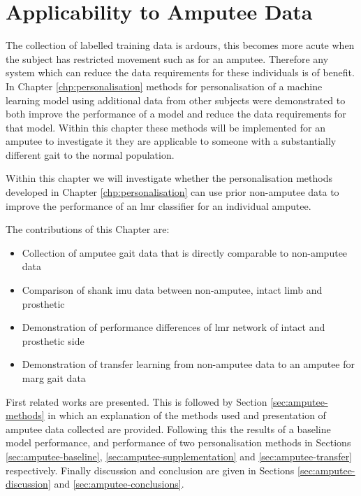 \chapter{Applicability to Amputee Data}
\label{chp:amputee-data}

The collection of labelled training data is ardours, this becomes more acute when the subject has restricted movement such as for an amputee. Therefore any system which can reduce the data requirements for these individuals is of benefit. In Chapter \ref{chp:personalisation} methods for personalisation of a machine learning model using additional data from other subjects were demonstrated to both improve the performance of a model and reduce the data requirements for that model. Within this chapter these methods will be implemented for an amputee to investigate it they are applicable to someone with a substantially different gait to the normal population.

Within this chapter we will investigate whether the personalisation methods developed in Chapter \ref{chp:personalisation} can use prior non-amputee data to improve the performance of an \acrshort{lmr} classifier for an individual amputee.

The contributions of this Chapter are:
\begin{itemize}
    \item Collection of amputee gait data that is directly comparable to non-amputee data
    \item Comparison of shank \acrshort{imu} data between non-amputee, intact limb and prosthetic
    \item Demonstration of performance differences of \acrshort{lmr} network of intact and prosthetic side
    \item Demonstration of transfer learning from non-amputee data to an amputee for \acrshort{marg} gait data
\end{itemize}

First related works are presented. This is followed by Section \ref{sec:amputee-methods} in which an explanation of the methods used and presentation of amputee data collected are provided. Following this the results of a baseline model performance, and performance of two personalisation methods in Sections \ref{sec:amputee-baseline}, \ref{sec:amputee-supplementation} and \ref{sec:amputee-transfer} respectively. Finally discussion and conclusion are given in Sections \ref{sec:amputee-discussion} and \ref{sec:amputee-conclusions}.


